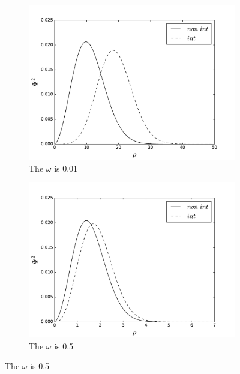 \documentclass[10pt]{article}
\begin{document}
\newpage

\begin{figure}[h!] 
  \begin{subfigure}[b]{0.6\linewidth}
    \centering
    \includegraphics[width=1.1\linewidth]{two_nint_001} 
    \caption{The $\omega$ is 0.01} 
    \label{fig2:a} 
    \vspace{1ex}
  \end{subfigure}%
  \begin{subfigure}[b]{0.6\linewidth}
    \centering
    \includegraphics[width=1.1\linewidth]{two_nint_05} 
    \caption{ The $\omega$ is 0.5} 
    \label{fig2:b} 
    \vspace{1ex}
  \end{subfigure} 

\end{figure}
\end{document}

